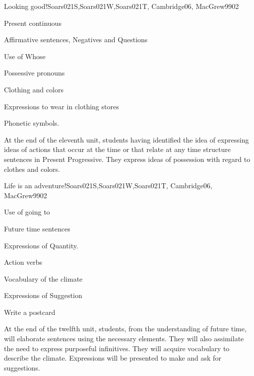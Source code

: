 \begin{syllabus}
\begin{unit}{}{Looking good!}{Soars021S,Soars021W,Soars021T, Cambridge06, MacGrew99}{0}{2}
   \begin{topics}
      \item Present continuous
      \item Affirmative sentences, Negatives and Questions 
      \item Use of Whose
      \item Possessive pronouns
      \item Clothing and colors
      \item Expressions to wear in clothing stores
      \item Phonetic symbols.
   \end{topics}

   \begin{learningoutcomes}
      \item At the end of the eleventh unit, students having identified the idea of expressing ideas of actions that occur at the time or that relate at any time structure sentences in Present Progressive. They express ideas of possession with regard to clothes and colors.
   \end{learningoutcomes}

\end{unit}

\begin{unit}{}{Life is an adventure!}{Soars021S,Soars021W,Soars021T, Cambridge06, MacGrew99}{0}{2}
   \begin{topics}
      \item Use of going to
      \item Future time sentences
      \item Expressions of Quantity.
      \item Action verbs
      \item Vocabulary of the climate
      \item Expressions of Suggestion
      \item Write a postcard
   \end{topics}
   \begin{learningoutcomes}
      \item At the end of the twelfth unit, students, from the understanding of future time, will elaborate sentences using the necessary elements. They will also assimilate the need to express purposeful infinitives. They will acquire vocabulary to describe the climate. Expressions will be presented to make and ask for suggestions.
   \end{learningoutcomes}
\end{unit}


\end{syllabus}

